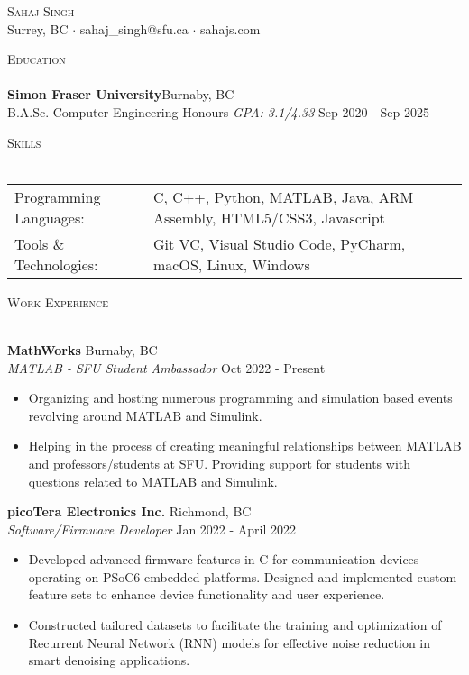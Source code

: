 \documentclass[a4paper]{article}
\newcommand{\lineunder} {
    \vspace*{-8pt} \\
    \hspace*{-18pt} \hrulefill \\
}
\newcommand{\header} [1] {
    {\hspace*{-18pt}\vspace*{6pt} \textsc{#1}}
    \vspace*{-6pt} \lineunder
}
\begin{document}
\vspace*{-40pt}

    

\vspace*{-10pt}
\begin{center}
	{\Huge \scshape {Sahaj Singh}}\\
	Surrey, BC $\cdot$ sahaj\_singh@sfu.ca $\cdot$ sahajs.com\\
\end{center}

\header{Education}
\textbf{Simon Fraser University}\hfill Burnaby, BC\\
B.A.Sc. Computer Engineering Honours \textit{GPA: 3.1/4.33} \hfill Sep 2020 - Sep 2025\\
\vspace{2mm}

\header{Skills}
\begin{tabular}{ l l }
	Programming Languages: & C, C++, Python, MATLAB, Java, ARM Assembly, HTML5/CSS3, Javascript \\
	Tools \& Technologies: & Git VC, Visual Studio Code, PyCharm, macOS, Linux, Windows         \\
\end{tabular}
\vspace{1mm}

\header{Work Experience}
\vspace{1mm}

\textbf{MathWorks} \hfill Burnaby, BC\\
\textit{MATLAB - SFU Student Ambassador} \hfill Oct 2022 - Present\\
\vspace{-1mm}
\begin{itemize} \itemsep 1pt
	\item Organizing and hosting numerous programming and simulation based events revolving around MATLAB and Simulink.
	\item Helping in the process of creating meaningful relationships between MATLAB and professors/students at SFU. Providing support for students with questions related to MATLAB and Simulink.
\end{itemize}
\textbf{picoTera Electronics Inc.} \hfill Richmond, BC\\
\textit{Software/Firmware Developer} \hfill Jan 2022 - April 2022\\
\vspace{-1mm}
\begin{itemize} \itemsep 1pt
	\item Developed advanced firmware features in C for communication devices operating on PSoC6 embedded platforms. Designed and implemented custom feature sets to enhance device functionality and user experience.
	\item Constructed tailored datasets to facilitate the training and optimization of Recurrent Neural Network (RNN) models for effective noise reduction in smart denoising applications.
\end{itemize}
\end{document}
